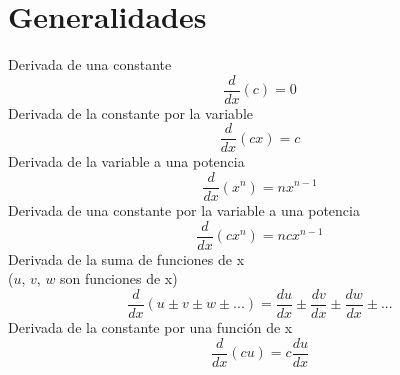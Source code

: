 \section{Generalidades}
Derivada de una constante
\begin{equation}
	\frac{d}{dx}(c)=0
\end{equation}
Derivada de la constante por la variable
\begin{equation}
	\frac{d}{dx}(cx)=c
\end{equation}
Derivada de la variable a una potencia
\begin{equation}
	\frac{d}{dx}(x^n)=nx^{n-1}
\end{equation}
Derivada de una constante por la variable a una potencia
\begin{equation}
	\frac{d}{dx}(cx^n)=ncx^{n-1}
\end{equation}
Derivada de la suma de funciones de x\\
($u$, $v$, $w$ son funciones de x)
\begin{equation}
	\frac{d}{dx}(u\pm v\pm w \pm ...)=\frac{du}{dx}\pm\frac{dv}{dx}\pm\frac{dw}{dx}\pm...
\end{equation}
Derivada de la constante por una función de x
\begin{equation}
	\frac{d}{dx}(cu)=c\frac{du}{dx}
\end{equation}